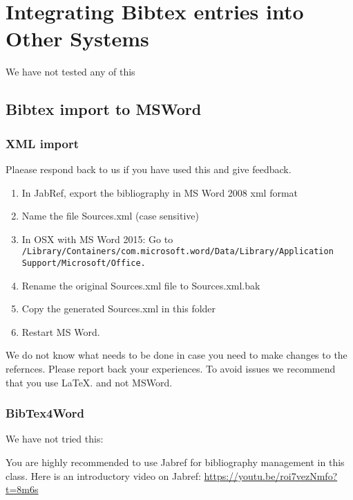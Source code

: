 \section{Integrating Bibtex entries into Other Systems}

We have not tested any of this
\subsection{Bibtex import to MSWord}\label{bibtex-import-to-msword}


\subsubsection{XML import}\label{xml-import}

Plaease respond back to us if you have used this and give feedback.

\begin{enumerate}

\item  In JabRef, export the bibliography in MS Word 2008 xml format

\item  Name the file Sources.xml (case sensitive)
\item   In OSX with MS Word 2015: Go to
  \verb|/Library/Containers/com.microsoft.word/Data/Library/Application Support/Microsoft/Office.|
\item  Rename the original Sources.xml file to Sources.xml.bak
\item  Copy the generated Sources.xml in this folder
\item  Restart MS Word.

\end{enumerate}

We do not know what needs to be done in case you need to make changes to
the refernces. Please report back your experiences. To avoid issues we
recommend that you use LaTeX. and not MSWord.

\subsubsection{BibTex4Word}\label{bibtex4word}

We have not tried this:



You are highly recommended to use Jabref for bibliography management in
this class. Here is an introductory video on Jabref:
\url{https://youtu.be/roi7vezNmfo?t=8m6s}

